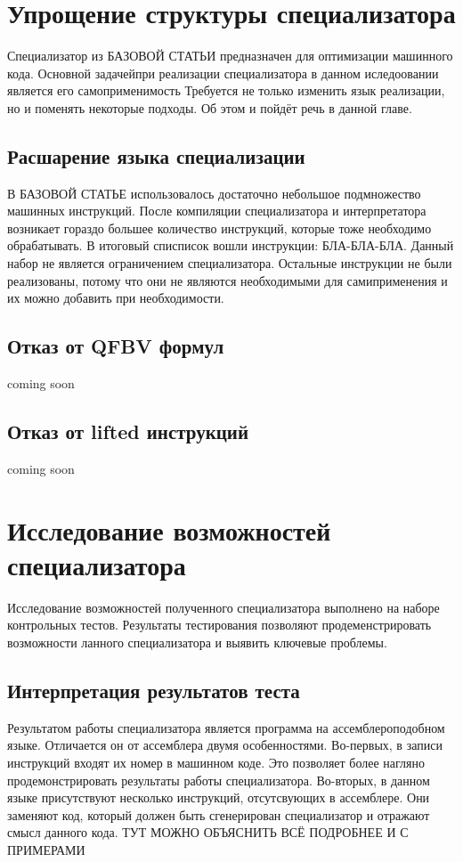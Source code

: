 \documentclass{spbau-diploma}
\begin{document}
\section{Упрощение структуры специализатора}
Специализатор из {\LARGE БАЗОВОЙ СТАТЬИ} предназначен для оптимизации машинного кода. Основной задачейпри реализации специализатора в данном иследоовании является его самоприменимость Требуется не только изменить язык реализации, но и поменять некоторые подходы. Об этом и пойдёт речь в данной главе.
\subsection{ Расшарение языка специализации}
В {\LARGE БАЗОВОЙ СТАТЬЕ} использовалось достаточно небольшое подмножество машинных инструкций. После компиляции специализатора и интерпретатора возникает гораздо большее количество инструкций, которые тоже необходимо обрабатывать. В итоговый списписок вошли инструкции: {\Large БЛА-БЛА-БЛА}. Данный набор не является ограничением специализатора. Остальные инструкции не были реализованы, потому что они не являются необходимыми для самиприменения и их можно добавить при необходимости.
\subsection{ Отказ от QFBV формул}
coming soon
\subsection{ Отказ от lifted инструкций}
coming soon
\section{Исследование возможностей специализатора}
Исследование возможностей полученного специализатора выполнено на наборе контрольных тестов. Результаты тестирования позволяют продеменстрировать возможности ланного специализатора и выявить ключевые проблемы.

\subsection*{Интерпретация результатов теста}
Результатом работы специализатора является программа на ассемблероподобном языке. Отличается он от ассемблера двумя особенностями. Во-первых, в записи инструкций входят их номер в машинном коде. Это позволяет более нагляно продемонстрировать результаты работы специализатора. Во-вторых, в данном языке присутствуют несколько инструкций, отсутсвующих в ассемблере. Они заменяют код, который должен быть сгенерирован специализатор и отражают смысл данного кода. {\Large ТУТ МОЖНО ОБЪЯСНИТЬ ВСЁ ПОДРОБНЕЕ И С ПРИМЕРАМИ}
\end{document}

